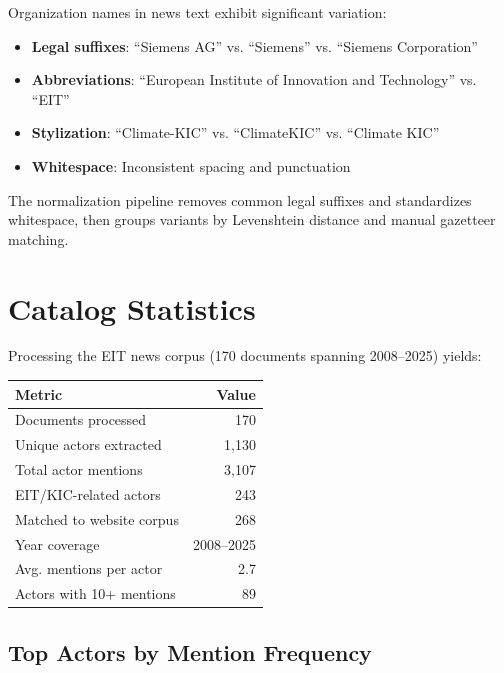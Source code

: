 \documentclass[../main.tex]{subfiles}
\begin{document}
Organization names in news text exhibit significant variation:

\begin{itemize}[leftmargin=*, itemsep=0.2em]
\item \textbf{Legal suffixes}: ``Siemens AG'' vs. ``Siemens'' vs. ``Siemens Corporation''
\item \textbf{Abbreviations}: ``European Institute of Innovation and Technology'' vs. ``EIT''
\item \textbf{Stylization}: ``Climate-KIC'' vs. ``ClimateKIC'' vs. ``Climate KIC''
\item \textbf{Whitespace}: Inconsistent spacing and punctuation
\end{itemize}

The normalization pipeline removes common legal suffixes and standardizes whitespace, then groups variants by Levenshtein distance and manual gazetteer matching.


\section{Catalog Statistics}

Processing the EIT news corpus (170 documents spanning 2008--2025) yields:

\tableminimal
\begin{center}
\begin{tabular}{@{}lr@{}}
\toprule
\textbf{Metric} & \textbf{Value} \\
\midrule
Documents processed & 170 \\
Unique actors extracted & 1,130 \\
Total actor mentions & 3,107 \\
EIT/KIC-related actors & 243 \\
Matched to website corpus & 268 \\
Year coverage & 2008--2025 \\
Avg. mentions per actor & 2.7 \\
Actors with 10+ mentions & 89 \\
\bottomrule
\end{tabular}
\end{center}

\subsection{Top Actors by Mention Frequency}
\end{document}
